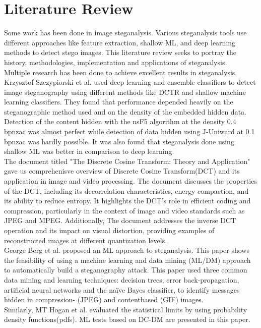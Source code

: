 \chapter{Literature Review}
Some work has been done in image steganalysis. Various steganalysis tools use different approaches like feature extraction, shallow ML, and deep learning methods to detect stego images. This literature review seeks to portray the history, methodologies, implementation and applications of steganalysis.\\
Multiple research has been done to achieve excellent results in steganalysis. Krzysztof Szczypiorski et al.\cite{1} used deep learning and ensemble classifiers to detect image steganography using different methods like DCTR and shallow machine learning classifiers. They found that performance depended heavily on the steganographic method used and on the density of the embedded hidden data. Detection of the content hidden with the nsF5 algorithm at the density 0.4 bpnzac was almost perfect while detection of data hidden using J-Uniward at 0.1 bpnzac was hardly possible. It was also found that steganalysis done using shallow ML was better in comparison to deep learning.\\
The document titled "The Discrete Cosine Transform: Theory and Application" \cite{4} gave us comprehenisve overview of Discrete Cosine Transform(DCT) and its application in image and video processing. The document discusses the properties of the DCT, including its decorrelation characteristics, energy compaction, and its ability to reduce entropy. It highlights the DCT's role in efficient coding and compression, particularly in the context of image and video standards such as JPEG and MPEG. Additionally, The document addresses the inverse DCT operation and its impact on visual distortion, providing examples of reconstructed images at different quantization levels.\\
George Berg et al.\cite{2} proposed an ML approach to steganalysis. This paper shows the feasibility of using a machine learning and data mining (ML/DM) approach to automatically build a steganography attack. This paper used three common data mining and learning techniques: decision trees, error back-propagation, artificial neural networks and the naïve Bayes classifier, to identify messages hidden in compression- (JPEG) and contentbased (GIF) images.\\
Similarly, MT Hogan et al.\cite{3} evaluated the statistical limits by using probability density functions(pdfs). ML tests based on DC-DM are presented in this paper. \\
